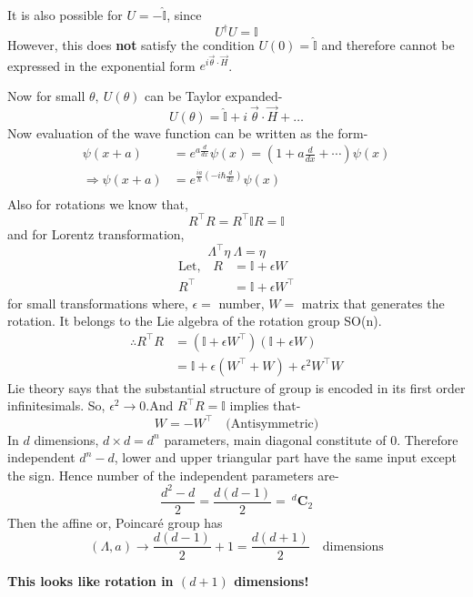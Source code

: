 \documentclass[14pt]{article} %
\begin{document}
\begin{tcolorbox}[proofbox, title=\textbf{Note}]
It is also possible for $U = -\hat{\mathbb{I}}$, since
\[
U^\dagger U = \mathbb{I}
\]
However, this does \textbf{not} satisfy the condition $U(0) = \hat{\mathbb{I}}$ and therefore cannot be expressed in the exponential form $e^{ i \vec{\theta}\cdot\vec{H}}$.
\end{tcolorbox}
\noindent
Now for small $\theta,~U(\theta)$ can be Taylor expanded-
\[
U(\theta) = \hat{\mathbb{I}} + i ~\vec{\theta}\cdot \vec{H} + \dots
\]
Now evaluation of the wave function can be written as the form-
\begin{align*}
\psi(x + a) &= e^{a \frac{d}{dx}} \psi(x) = \left(1 + a \frac{d}{dx} + \cdots \right) \psi(x) \\
\Rightarrow \psi(x + a) &= e^{\frac{ia}{\hbar} (-i \hbar \frac{d}{dx})} \psi(x) \\
\end{align*}
Also for rotations we know that,
\[
R^\top R = R^\top \mathbb{I} R = \mathbb{I}
\]
and for Lorentz transformation,
\[
\Lambda^\top \eta~ \Lambda = \eta
\]
\begin{align*}
\text{Let,}\quad R &= \mathbb{I} + \epsilon W \\
R^\top &= \mathbb{I} + \epsilon W^\top
\end{align*}
for small transformations where, $\epsilon =$ number, $W=$ matrix that generates the rotation. It belongs to the Lie algebra of the rotation group SO(n).
\begin{align*}
\therefore R^\top R &= (\mathbb{I} + \epsilon W^\top)(\mathbb{I} + \epsilon W) \\
&= \mathbb{I} + \epsilon(W^\top + W) + \epsilon^2 W^\top W 
\end{align*}
Lie theory says that the substantial structure of group is encoded in its first order infinitesimals. So, $\epsilon^2 \rightarrow0$.And $R^\top R = \mathbb{I}$ implies that-
\[
W = -W^\top \quad \text{(Antisymmetric)}
\]
In $d$ dimensions, $d \times d = d^n$ parameters, main diagonal constitute of 0. Therefore independent $d^n -d$, lower and upper triangular part have the same input except the sign.
Hence number of the independent parameters are-
\[
\frac{d^2 -d }{2} = \frac{d(d-1)}{2} = ~^d\mathbf{C}_2
\]
Then the affine or, Poincaré group has 
\[
(\Lambda,a) \rightarrow \frac{d(d-1)}{2} + 1 = \frac{d(d+1)}{2} \quad \text{dimensions}
\]
\begin{center}
    \textbf{This looks like rotation in $(d + 1)$ dimensions!}
\end{center}
\end{document}
